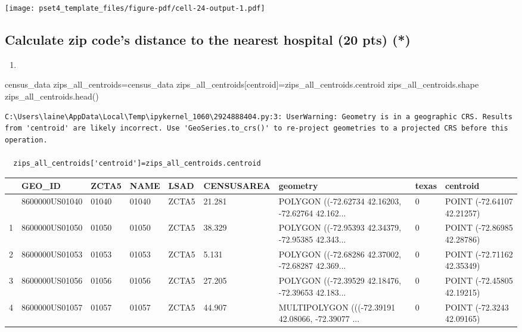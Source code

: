 \documentclass[
  letterpaper,
  DIV=11,
  numbers=noendperiod]{scrartcl}
\newenvironment{Shaded}{\begin{snugshade}}{\end{snugshade}}
\newcommand{\NormalTok}[1]{\textcolor[rgb]{0.00,0.23,0.31}{#1}}
\newcommand{\OperatorTok}[1]{\textcolor[rgb]{0.37,0.37,0.37}{#1}}
\newcommand{\StringTok}[1]{\textcolor[rgb]{0.13,0.47,0.30}{#1}}
\providecommand{\tightlist}{%
  \setlength{\itemsep}{0pt}\setlength{\parskip}{0pt}}\usepackage{longtable,booktabs,array}
\begin{document}
\texttt{[image: pset4\_template\_files/figure-pdf/cell-24-output-1.pdf]}

\subsection{Calculate zip code's distance to the nearest hospital (20
pts)
(*)}\label{calculate-zip-codes-distance-to-the-nearest-hospital-20-pts}

\begin{enumerate}
\def\labelenumi{\arabic{enumi}.}
\tightlist
\item
\end{enumerate}

\begin{Shaded}
\begin{Highlighting}[]
\NormalTok{census\_data}
\NormalTok{zips\_all\_centroids}\OperatorTok{=}\NormalTok{census\_data}
\NormalTok{zips\_all\_centroids[}\StringTok{\textquotesingle{}centroid\textquotesingle{}}\NormalTok{]}\OperatorTok{=}\NormalTok{zips\_all\_centroids.centroid}
\NormalTok{zips\_all\_centroids.shape}
\NormalTok{zips\_all\_centroids.head()}
\end{Highlighting}
\end{Shaded}

\begin{verbatim}
C:\Users\laine\AppData\Local\Temp\ipykernel_1060\2924888404.py:3: UserWarning: Geometry is in a geographic CRS. Results from 'centroid' are likely incorrect. Use 'GeoSeries.to_crs()' to re-project geometries to a projected CRS before this operation.

  zips_all_centroids['centroid']=zips_all_centroids.centroid
\end{verbatim}

\begin{longtable}[]{@{}lllllllll@{}}
\toprule\noalign{}
& GEO\_ID & ZCTA5 & NAME & LSAD & CENSUSAREA & geometry & texas &
centroid \\
\midrule\noalign{}
\endhead
\bottomrule\noalign{}
\endlastfoot
0 & 8600000US01040 & 01040 & 01040 & ZCTA5 & 21.281 & POLYGON
((-72.62734 42.16203, -72.62764 42.162... & 0 & POINT (-72.64107
42.21257) \\
1 & 8600000US01050 & 01050 & 01050 & ZCTA5 & 38.329 & POLYGON
((-72.95393 42.34379, -72.95385 42.343... & 0 & POINT (-72.86985
42.28786) \\
2 & 8600000US01053 & 01053 & 01053 & ZCTA5 & 5.131 & POLYGON ((-72.68286
42.37002, -72.68287 42.369... & 0 & POINT (-72.71162 42.35349) \\
3 & 8600000US01056 & 01056 & 01056 & ZCTA5 & 27.205 & POLYGON
((-72.39529 42.18476, -72.39653 42.183... & 0 & POINT (-72.45805
42.19215) \\
4 & 8600000US01057 & 01057 & 01057 & ZCTA5 & 44.907 & MULTIPOLYGON
(((-72.39191 42.08066, -72.39077 ... & 0 & POINT (-72.3243 42.09165) \\
\end{longtable}
\end{document}
